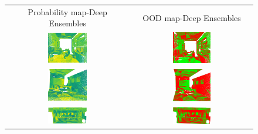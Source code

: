         \begin{figure}[h!]
            \centering
            \begin{tabular}{cc}
                Probability map-Deep Ensembles & OOD map-Deep Ensembles \\
                \includegraphics[width=0.33\textwidth, height=0.18\textheight]{images/ood_imgs/de_s3dis/ofc_3_de_prob.png}& 
                \includegraphics[width=0.33\textwidth, height=0.18\textheight]{images/ood_imgs/de_s3dis/de_prob_2.png}\\
    
                \includegraphics[width=0.33\textwidth, height=0.18\textheight]{images/ood_imgs/de_s3dis/cf1_de_prob.png}& 
                \includegraphics[width=0.33\textwidth, height=0.18\textheight]{images/ood_imgs/de_s3dis/de_prob_4.png}\\
    
                \includegraphics[width=0.33\textwidth, height=0.18\textheight]{images/ood_imgs/de_s3dis/pnt_1_de_prob.png}& 
                \includegraphics[width=0.33\textwidth, height=0.18\textheight]{images/ood_imgs/de_s3dis/de_prob_3.png}\\
    

\end{tabular}
\end{figure}
